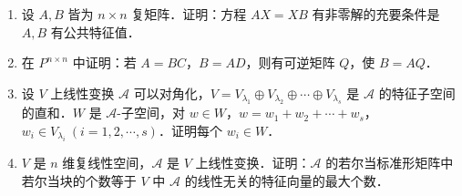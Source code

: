 \begin{enumerate}
  \item 设 $A,B$ 皆为 $n\times n$ 复矩阵．证明：方程 $AX=XB$ 有非零解的充要条件是 $A,B$ 有公共特征值．

  \ansproof
  \item 在 $P^{n\times n}$ 中证明：若 $A=BC$，$B=AD$，则有可逆矩阵 $Q$，使 $B=AQ$．

  \ansproof
  \item 设 $V$ 上线性变换 $\mathcal{A}$ 可以对角化，$V=V_{\lambda_1}\oplus V_{\lambda_2}\oplus\cdots\oplus V_{\lambda_s}$ 是 $\mathcal{A}$ 的特征子空间的直和．$W$ 是 $\mathcal{A}$-子空间，对 $w\in W$，$w=w_1+w_2+\cdots+w_s$，$w_i\in V_{\lambda_i}\ (i=1,2,\cdots,s)$．证明每个 $w_i\in W$．

  \ansproof
  \item $V$ 是 $n$ 维复线性空间，$\mathcal{A}$ 是 $V$ 上线性变换．证明：$\mathcal{A}$ 的若尔当标准形矩阵中若尔当块的个数等于 $V$ 中 $\mathcal{A}$ 的线性无关的特征向量的最大个数．
  \ansproof
\end{enumerate}
